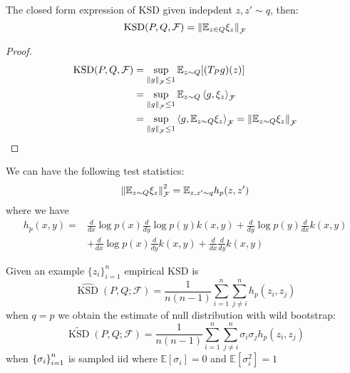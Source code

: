 \begin{proposition}
    The closed form expression of KSD given indepdent $z,z'\sim q$, then:
    \begin{equation*}
        \operatorname{KSD}(P, Q, \mathcal{F}) = \left\lVert\mathbb{E}_{z\in Q}\xi_z\right\rVert_\mathcal{F}
    \end{equation*}
\end{proposition}
\begin{proof}
\begin{equation*}
\begin{aligned}
    \operatorname{KSD}(P, Q, \mathcal{F}) &= \sup_{\left\lVert g\right\rVert_\mathcal{F}\le1}\mathbb{E}_{z\sim Q}[(T_Pg)(z)]  \\
    &=  \sup_{\left\lVert g\right\rVert_\mathcal{F}\le1}\mathbb{E}_{z\sim Q} \left\langle g, \xi_z \right\rangle_\mathcal{F} \\
    &=  \sup_{\left\lVert g\right\rVert_\mathcal{F}\le1} \left\langle g, \mathbb{E}_{z\sim Q}\xi_z \right\rangle_\mathcal{F} = \left\lVert\mathbb{E}_{z\sim Q}\xi_z\right\rVert_\mathcal{F}
\end{aligned}
\end{equation*}
\end{proof}

\begin{proposition}
    We can have the following test statistics:
    \begin{equation*}
        \left\lVert\mathbb{E}_{z\sim Q}\xi_z\right\rVert_\mathcal{F}^2 = \mathbb{E}_{z,z'\sim q}h_p(z,z')
    \end{equation*}
    where we have 
    \begin{equation*}
    \begin{aligned}
        h_p(x, y) = &\frac{d}{dx}\log p(x)\frac{d}{dy}\log p(y)k(x, y) + \frac{d}{dy}\log p(y) \frac{d}{dx}k(x, y) \\
        &+ \frac{d}{dx}\log p(x)\frac{d}{dy}k(x, y) + \frac{d}{dx}\frac{d}{dy}k(x, y) 
    \end{aligned}
    \end{equation*}
\end{proposition}

\begin{remark}
    Given an example $\{z_i\}^n_{i=1}$ empirical KSD is 
    \begin{equation*}
        \widehat{\operatorname{KSD}}(P, Q;\mathcal{F}) = \frac{1}{n(n-1)}\sum^n_{i=1}\sum^n_{j\ne i} h_p(z_i, z_j)
    \end{equation*}
    when $q = p$ we obtain the estimate of null distribution with wild bootstrap: 
    \begin{equation*}
        \widetilde{\operatorname{KSD}}(P, Q;\mathcal{F}) = \frac{1}{n(n-1)}\sum^n_{i=1}\sum^n_{j\ne i} \sigma_i\sigma_j h_p(z_i, z_j)
    \end{equation*}
    when $\left\{ \sigma_i \right\}^n_{i=1}$ is sampled iid where $\mathbb{E}[\sigma_i] = 0$ and $\mathbb{E}[\sigma^2_i] = 1$
\end{remark}

